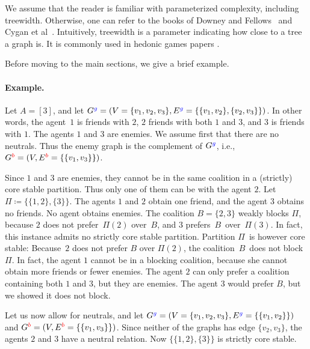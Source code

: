 \documentclass[a4paper,fleqn]{cas-sc}
\newcommand{\friendshipColor}{blue}
\newcommand{\enemyColor}{red}
\newcommand{\agentSet}{\ensuremath{A}\xspace}
\newcommand{\partition}{\ensuremath{\Pi}\xspace}
\newcommand{\friendSuperscript}{{\color{\friendshipColor}g}}
\newcommand{\enemySuperscript}{{\color{\enemyColor}b}}
\newcommand{\friendshipGraph}{\ensuremath{G^{\friendSuperscript}}\xspace}
\newcommand{\enemyGraph}{\ensuremath{G^{\enemySuperscript}}\xspace}
\newcommand{\friendshipEdgeSet}{\ensuremath{E^{\friendSuperscript}}\xspace}
\newcommand{\enemyEdgeSet}{\ensuremath{E^{\enemySuperscript}}\xspace}
\newcommand{\coalB}{\ensuremath{B}}
\begin{document}
We assume that the reader is familiar with parameterized complexity, including treewidth. Otherwise, one can refer to the books of Downey and Fellows~\cite{downey2012parameterized} and Cygan et al~\cite{cygan2020parameterized}. Intuitively, treewidth is a parameter indicating how close to a tree a graph is. It is commonly used in hedonic games papers \cite{peters2016graphical,hanaka2022tree,hanaka2024core}.

Before moving to the main sections, we give a brief example.

\paragraph{Example.}
Let $\agentSet = [3]$, and let  $\friendshipGraph = (V = \{v_1, v_2, v_3\}, \friendshipEdgeSet = \{\{v_1, v_2\}, \{v_2, v_3\}\})$. In other words, the agent~$1$ is friends with $2$, $2$ friends with both $1$ and $3$, and $3$ is friends with $1$. The agents $1$ and $3$ are enemies.
We assume first that there are no neutrals. Thus the enemy graph is the complement of $\friendshipGraph$, i.e., $\enemyGraph = (V, \enemyEdgeSet = \{\{v_1, v_3\}\})$.

Since $1$ and $3$ are enemies, they cannot be in the same coalition in a (strictly) core stable partition.
Thus only one of them can be with the agent $2$.
Let $\partition \coloneqq\{\{1,2\}, \{3\}\}$. The agents $1$ and $2$ obtain one friend, and the agent $3$ obtains no friends. No agent obtains enemies.
The coalition $\coalB = \{2,3\}$ weakly blocks $\partition$, because $2$ does not prefer~$\partition(2)$ over~$\coalB$, and $3$ prefers~\coalB\ over~$\partition(3)$.
In fact, this instance admits no strictly core stable partition.
Partition \partition\ is however core stable: Because~$2$ does not prefer $\coalB$ over $\partition(2)$, the coalition~\coalB\ does not block \partition. 
In fact, the agent $1$ cannot be in a blocking coalition, because she cannot obtain more friends or fewer enemies.
The agent $2$ can only prefer a coalition containing both $1$ and $3$, but they are enemies.
The agent $3$ would prefer \coalB, but we showed it does not block.

Let us now allow for neutrals, and let $\friendshipGraph = (V = \{v_1, v_2, v_3\}, \friendshipEdgeSet = \{\{v_1, v_2\}\})$ and $\enemyGraph = (V, \enemyEdgeSet = \{\{v_1, v_3\}\})$. Since neither of the graphs has edge $\{v_2, v_3\}$, the agents $2$ and $3$ have a neutral relation.
Now $\{\{1,2\}, \{3\}\}$ is strictly core stable.
\end{document}
